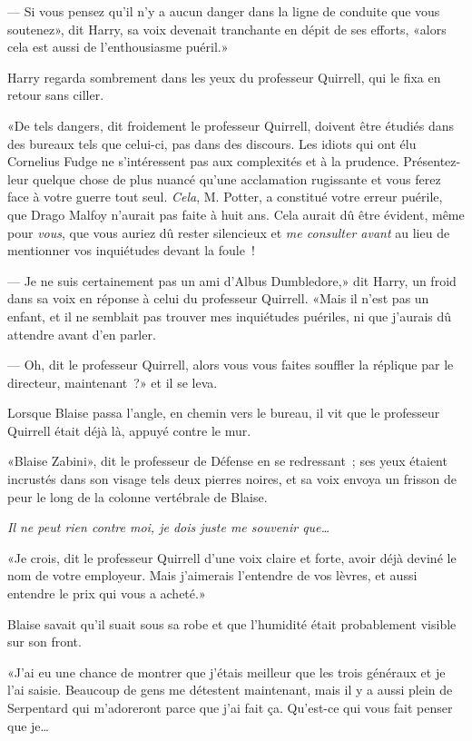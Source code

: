 --- Si vous pensez qu'il n'y a aucun danger dans la ligne de conduite que vous soutenez», dit Harry, sa voix devenait tranchante en dépit de ses efforts, «alors cela est aussi de l'enthousiasme puéril.»

Harry regarda sombrement dans les yeux du professeur Quirrell, qui le fixa en retour sans ciller.

«De tels dangers, dit froidement le professeur Quirrell, doivent être étudiés dans des bureaux tels que celui-ci, pas dans des discours. Les idiots qui ont élu Cornelius Fudge ne s'intéressent pas aux complexités et à la prudence. Présentez-leur quelque chose de plus nuancé qu'une acclamation rugissante et vous ferez face à votre guerre tout seul. \emph{Cela}, M. Potter, a constitué votre erreur puérile, que Drago Malfoy n'aurait pas faite à huit ans. Cela aurait dû être évident, même pour \emph{vous}, que vous auriez dû rester silencieux et \emph{me consulter avant} au lieu de mentionner vos inquiétudes devant la foule~!

--- Je ne suis certainement pas un ami d'Albus Dumbledore,» dit Harry, un froid dans sa voix en réponse à celui du professeur Quirrell. «Mais il n'est pas un enfant, et il ne semblait pas trouver mes inquiétudes puériles, ni que j'aurais dû attendre avant d'en parler.

--- Oh, dit le professeur Quirrell, alors vous vous faites souffler la réplique par le directeur, maintenant~?» et il se leva.

\later

Lorsque Blaise passa l'angle, en chemin vers le bureau, il vit que le professeur Quirrell était déjà là, appuyé contre le mur.

«Blaise Zabini», dit le professeur de Défense en se redressant~; ses yeux étaient incrustés dans son visage tels deux pierres noires, et sa voix envoya un frisson de peur le long de la colonne vertébrale de Blaise.

\emph{Il ne peut rien contre moi, je dois juste me souvenir que…}

«Je crois, dit le professeur Quirrell d'une voix claire et forte, avoir déjà deviné le nom de votre employeur. Mais j'aimerais l'entendre de vos lèvres, et aussi entendre le prix qui vous a acheté.»

Blaise savait qu'il suait sous sa robe et que l'humidité était probablement visible sur son front.

«J'ai eu une chance de montrer que j'étais meilleur que les trois généraux et je l'ai saisie. Beaucoup de gens me détestent maintenant, mais il y a aussi plein de Serpentard qui m'adoreront parce que j'ai fait ça. Qu'est-ce qui vous fait penser que je…

